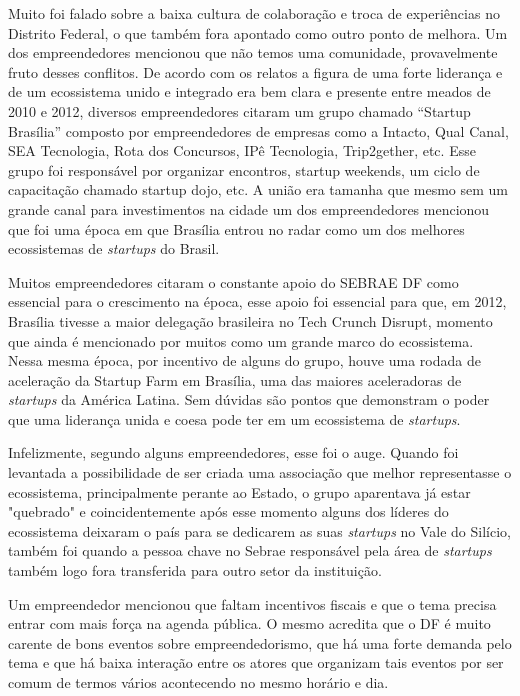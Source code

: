 Muito foi falado sobre a baixa cultura de colaboração e troca de experiências no Distrito Federal, o que também fora apontado como outro ponto de melhora. Um dos empreendedores mencionou que não temos uma comunidade, provavelmente fruto desses conflitos. De acordo com os relatos a figura de uma forte liderança e de um ecossistema unido e integrado era bem clara e presente entre meados de 2010 e 2012, diversos empreendedores citaram um grupo chamado ``Startup Brasília'' composto por empreendedores de empresas como a Intacto, Qual Canal, SEA Tecnologia, Rota dos Concursos, IPê Tecnologia, Trip2gether, etc. Esse grupo foi responsável por organizar encontros, startup weekends, um ciclo de capacitação chamado startup dojo, etc. A união era tamanha que mesmo sem um grande canal para investimentos na cidade um dos empreendedores mencionou que foi uma época em que Brasília entrou no radar como um dos melhores ecossistemas de \textit{startups} do Brasil. 

Muitos empreendedores citaram o constante apoio do SEBRAE DF como essencial para o crescimento na época, esse apoio foi essencial para que, em 2012, Brasília tivesse a maior delegação brasileira no Tech Crunch Disrupt, momento que ainda é mencionado por muitos como um grande marco do ecossistema. Nessa mesma época, por incentivo de alguns do grupo, houve uma rodada de aceleração da Startup Farm em Brasília, uma das maiores aceleradoras de \textit{startups} da América Latina. Sem dúvidas são pontos que demonstram o poder que uma liderança unida e coesa pode ter em um ecossistema de \textit{startups}. 

Infelizmente, segundo alguns empreendedores, esse foi o auge. Quando foi levantada a possibilidade de ser criada uma associação que melhor representasse o ecossistema, principalmente perante ao Estado, o grupo aparentava já estar "quebrado" e coincidentemente após esse momento alguns dos líderes do ecossistema deixaram o país para se dedicarem as suas \textit{startups} no Vale do Silício, também foi quando a pessoa chave no Sebrae responsável pela área de \textit{startups} também logo fora transferida para outro setor da instituição.

Um empreendedor mencionou que faltam incentivos fiscais e que o tema precisa entrar com mais força na agenda pública. O mesmo acredita que o DF é muito carente de bons eventos sobre empreendedorismo, que há uma forte demanda pelo tema e que há baixa interação entre os atores que organizam tais eventos por ser comum de termos vários acontecendo no mesmo horário e dia. 


